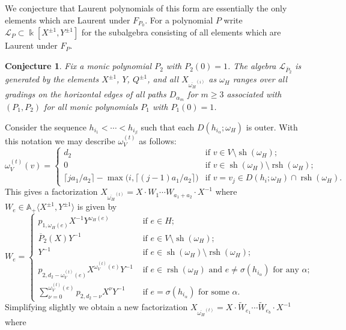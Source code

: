 \documentclass{amsart}
\newtheorem{conjecture}[theorem]{Conjecture}
\newcommand{\cL}{\mathcal{L}}
\newcommand{\kk}{\Bbbk}
\renewcommand{\AA}{\mathbb{A}}
\newcommand{\rsh}{\operatorname{rsh}}
\newcommand{\sh}{\operatorname{sh}}
\begin{document}
We conjecture that Laurent polynomials of this form are essentially the only elements which are Laurent under $F_{P_0}$.  For a polynomial $P$ write $\cL_P\subset\kk[X^{\pm1},Y^{\pm1}]$ for the subalgebra consisting of all elements which are Laurent under $F_P$.
\begin{conjecture}
Fix a monic polynomial $P_2$ with $P_2(0)=1$.  The algebra $\cL_{\bar{P}_2}$ is generated by the elements $X^{\pm1}$, $Y$, $Q^{\pm1}$, and all $ X_{\overline{\omega_H}^{(i)}}$ as $\omega_H$ ranges over all gradings on the horizontal edges of all paths $D_{\alpha_m}$ for $m\ge3$ associated with $(P_1,P_2)$ for all monic polynomials $P_1$ with $P_1(0)=1$.
\end{conjecture}


\newpage

Consider the sequence $h_{i_1}<\cdots<h_{i_\beta}$ such that each $D(h_{i_\alpha};\omega_H)$ is outer.  With this notation we may describe $\omega_V^{(t)}$ as follows:
\[\omega_V^{(t)}(v)=\begin{cases}d_2 & \text{if $v\in V\setminus\sh(\omega_H)$;}\\ 0 & \text{if $v\in\sh(\omega_H)\setminus\rsh(\omega_H)$;}\\ \lceil ja_1/a_2\rceil-\max\big(i,\lceil (j-1)a_1/a_2\rceil\big) & \text{if $v=v_j\in D(h_i;\omega_H)\cap\rsh(\omega_H)$.}\end{cases}\]
This gives a factorization $X_{\overline{\omega_H}^{(t)}}=X\cdot W_1\cdots W_{a_1+a_2}\cdot X^{-1}$ where $W_e\in\AA_+\langle X^{\pm1},Y^{\pm1}\rangle$ is given by
\[W_e=\begin{cases}p_{1,\omega_H(e)}X^{-1}Y^{\omega_H(e)} & \text{ if $e\in H$;}\\ \overline{P}_2(X)Y^{-1} & \text{ if $e\in V\setminus\sh(\omega_H);$}\\ Y^{-1} & \text{ if $e\in\sh(\omega_H)\setminus\rsh(\omega_H)$;}\\ p_{2,d_2-\omega_V^{(t)}(e)}X^{\omega_V^{(t)}(e)}Y^{-1} & \text{ if $e\in\rsh(\omega_H)$ and $e\ne\sigma(h_{i_\alpha})$ for any $\alpha$;}\\ \sum\limits_{\nu=0}^{\omega_V^{(t)}(e)}p_{2,d_2-\nu}X^\nu Y^{-1} & \text{ if $e=\sigma(h_{i_\alpha})$ for some $\alpha$.}\end{cases}\]
Simplifying slightly we obtain a new factorization $X_{\overline{\omega_H}^{(t)}}=X\cdot\tilde W_{e_1}\cdots\tilde W_{e_b}\cdot X^{-1}$ where
\end{document}
